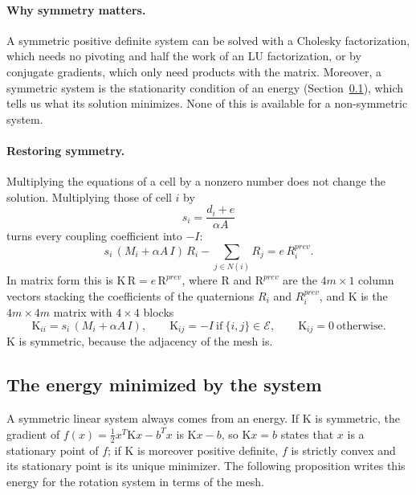 \documentclass{birkjour}
\theoremstyle{remark}
\numberwithin{equation}{section}
\begin{document}
\paragraph{Why symmetry matters.} A symmetric positive definite system can be solved with a Cholesky factorization, which needs no pivoting and half the work of an LU factorization, or by conjugate gradients, which only need products with the matrix. Moreover, a symmetric system is the stationarity condition of an energy (Section~\ref{section:exact_energy}), which tells us what its solution minimizes. None of this is available for a non-symmetric system.

\paragraph{Restoring symmetry.} Multiplying the equations of a cell by a nonzero number does not change the solution. Multiplying those of cell $i$ by
\begin{equation*}
s_i = \frac{d_i + e}{\alpha A}
\end{equation*}
turns every coupling coefficient into $-I$:
\begin{equation}
\label{eqn:local_symmetric}
s_i \, (M_i + \alpha A \, I) \, R_i - \sum_{j \in N(i)} R_j = e \, R^{prev}_i .
\end{equation}
In matrix form this is $\mathrm K \, \mathrm R = e \, \mathrm R^{prev}$, where $\mathrm R$ and $\mathrm R^{prev}$ are the $4m \times 1$ column vectors stacking the coefficients of the quaternions $R_i$ and $R^{prev}_i$, and $\mathrm K$ is the $4m \times 4m$ matrix with $4 \times 4$ blocks
\begin{equation*}
\mathrm K_{ii} = s_i \, (M_i + \alpha A \, I), \qquad
\mathrm K_{ij} = -I \ \text{if} \ \{i, j\} \in \mathcal E, \qquad
\mathrm K_{ij} = 0 \ \text{otherwise}.
\end{equation*}
$\mathrm K$ is symmetric, because the adjacency of the mesh is.

\subsection{The energy minimized by the system}
\label{section:exact_energy}

A symmetric linear system always comes from an energy. If $\mathrm K$ is symmetric, the gradient of $f(x) = \frac{1}{2} x^T \mathrm K x - b^T x$ is $\mathrm K x - b$, so $\mathrm K x = b$ states that $x$ is a stationary point of $f$; if $\mathrm K$ is moreover positive definite, $f$ is strictly convex and its stationary point is its unique minimizer. The following proposition writes this energy for the rotation system in terms of the mesh.
\end{document}
